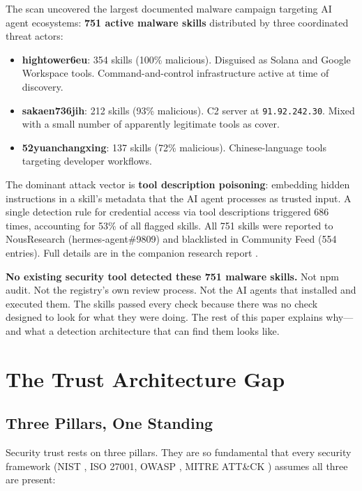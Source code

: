 \documentclass[11pt,letterpaper]{article}
\begin{document}
The scan uncovered the largest documented malware campaign targeting AI agent ecosystems: \textbf{751 active malware skills} distributed by three coordinated threat actors:

\begin{itemize}
\item \textbf{hightower6eu}: 354 skills (100\% malicious). Disguised as Solana and Google Workspace tools. Command-and-control infrastructure active at time of discovery.
\item \textbf{sakaen736jih}: 212 skills (93\% malicious). C2 server at \texttt{91.92.242.30}. Mixed with a small number of apparently legitimate tools as cover.
\item \textbf{52yuanchangxing}: 137 skills (72\% malicious). Chinese-language tools targeting developer workflows.
\end{itemize}

The dominant attack vector is \textbf{tool description poisoning}: embedding hidden instructions in a skill's metadata that the AI agent processes as trusted input. A single detection rule for credential access via tool descriptions triggered 686 times, accounting for 53\% of all flagged skills. All 751 skills were reported to NousResearch (hermes-agent\#9809) and blacklisted in Community Feed (554 entries). Full details are in the companion research report \cite{atrscanmega}.

\textbf{No existing security tool detected these 751 malware skills.} Not npm audit. Not the registry's own review process. Not the AI agents that installed and executed them. The skills passed every check because there was no check designed to look for what they were doing. The rest of this paper explains why---and what a detection architecture that can find them looks like.


\section{The Trust Architecture Gap}
\label{sec:trustgap}

\subsection{Three Pillars, One Standing}

Security trust rests on three pillars. They are so fundamental that every security framework (NIST \cite{nist}, ISO 27001, OWASP \cite{owaspllm,owaspagentic}, MITRE ATT\&CK \cite{mitreatlas}) assumes all three are present:
\end{document}
